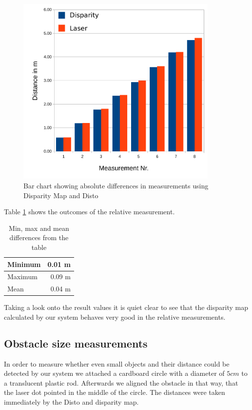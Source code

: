 \documentclass[11pt]{article}
\begin{document}
\begin{figure}[H]
        \centering
        \includegraphics[width=10cm]{images/relative-measurements.pdf}
        \caption{Bar chart showing absolute differences in measurements using Disparity Map and Disto}
        \label{fig:relative-chart}
\end{figure}

Table \ref{table:relative-results} shows the outcomes of the relative measurement.

\begin{table}[htbp]
	\begin{center}
	\begin{tabular}{|l|r|}
	\hline
	Minimum & 0.01 m \\ \hline
	Maximum & 0.09 m\\ \hline
	Mean & 0.04 m\\ \hline
	\end{tabular}
	\end{center}
	\caption{Min, max and mean differences from the table}
	\label{table:relative-results}
\end{table}

\noindent Taking a look onto the result values it is quiet clear to see that the disparity map calculated by our system behaves very good in the relative measurements.


\subsection{Obstacle size measurements}
In order to measure whether even small objects and their distance could be detected by our system we attached a cardboard circle with a diameter of $5cm$ to a translucent plastic rod. Afterwards we aligned the obstacle in that way, that the laser dot pointed in the middle of the circle. The distances were taken immediately by the Disto and disparity map.
\end{document}
